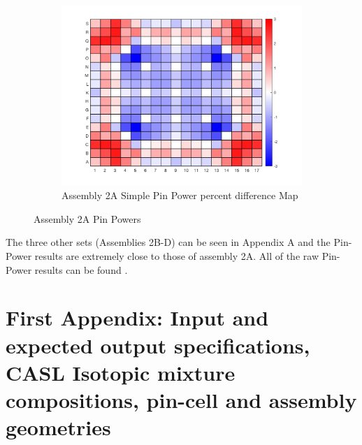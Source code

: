 \documentclass[12pt]{article}
\begin{document}
\begin{figure}[htb!]
        \label{fig:fig}
        \begin{subfigure}{\textwidth}
            \centering
            \includegraphics[scale=0.46]{Figures/2A_simple_pinpowerDiff.png}
            \caption{Assembly 2A Simple Pin Power percent difference Map}
            \label{fig:sub-firstA}
        \end{subfigure}
        \caption{Assembly 2A Pin Powers}
    \end{figure}

\newpage

The three other sets (Assemblies 2B-D) can be seen in Appendix A and the Pin-Power results are extremely close to those of assembly 2A. All of the raw Pin-Power results can be found \href{https://github.com/alex-stuart/LRS_internship_repo/tree/main/MatLab/Outputs}{\color{blue}{here}}.




\newpage
\thispagestyle{empty}
\appendix
\section{First Appendix: Input and expected output specifications, CASL Isotopic mixture compositions, pin-cell and assembly geometries}
\end{document}
